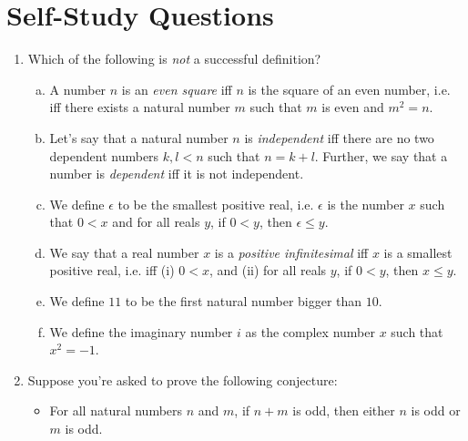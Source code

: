 \section{Self-Study Questions}

\begin{enumerate}[{\thesection}.1]


	\item Which of the following is \emph{not} a successful definition?

		\begin{enumerate}[(a)]
		
			\item A number $n$ is an \emph{even square} iff $n$ is the square of an even number, i.e. iff there exists a natural number $m$ such that $m$ is even and $m^2=n$.

			\item Let's say that a natural number $n$ is \emph{independent} iff there are no two dependent numbers $k,l<n$ such that $n=k+l$. Further, we say that a number is \emph{dependent} iff it is not independent.
			
			\item We define $\epsilon$ to be the smallest positive real, i.e. $\epsilon$ is the number $x$ such that $0<x$ and for all reals $y$, if $0<y$, then $\epsilon\leq y$.
		
			\item We say that a real number $x$ is a \emph{positive infinitesimal} iff $x$ is a smallest positive real, i.e. iff (i) $0<x$, and (ii) for all reals $y$, if $0<y$, then $x\leq y$.
		
			\item We define $11$ to be the first natural number bigger than $10$.
			
			\item We define the imaginary number $i$ as the complex number $x$ such that $x^2=-1$. 
			
					
		\end{enumerate}
		
		\item Suppose you're asked to prove the following conjecture:
			\begin{itemize}
			
				\item For all natural numbers $n$ and $m$, if $n+m$ is odd, then either $n$ is odd or $m$ is odd.
			
			\end{itemize}
				

\end{enumerate}
